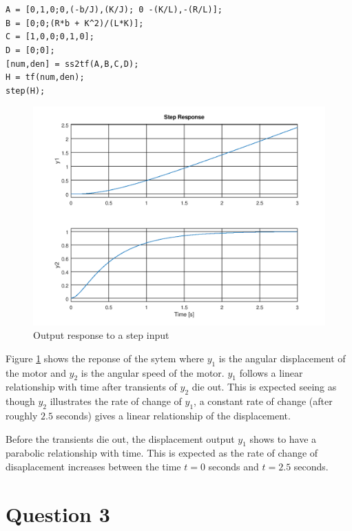 \documentclass[a4paper, 12pt]{article}
\begin{document}
\noindent
\texttt{A = [0,1,0;0,(-b/J),(K/J); 0 -(K/L),-(R/L)];}\\
\texttt{B = [0;0;(R*b + K\^{}2)/(L*K)];}\\
\texttt{C = [1,0,0;0,1,0];}\\
\texttt{D = [0;0];}\\
\texttt{[num,den] = ss2tf(A,B,C,D);}\\
\texttt{H = tf(num,den);}\\
\texttt{step(H);}\\

\begin{figure}[H]
	\centering
	\includegraphics[width=\textwidth]{Images/question_2_output_response.png}
	\caption{Output response to a step input}
	\label{fig:question_2_output_response}
\end{figure}

Figure \ref{fig:question_2_output_response} shows the reponse of the sytem where $y_1$ is the angular displacement of the motor and $y_2$ is the angular speed of the motor. $y_1$ follows a linear relationship with time after transients of $y_2$ die out. This is expected seeing as though $y_2$ illustrates the rate of change of $y_1$, a constant rate of change (after roughly $2.5$ seconds) gives a linear relationship of the displacement. 

Before the transients die out, the displacement output $y_1$ shows to have a parabolic relationship with time. This is expected as the rate of change of disaplacement increases between the time $t=0$ seconds and $t=2.5$ seconds.    


\section{Question 3}
\end{document}
